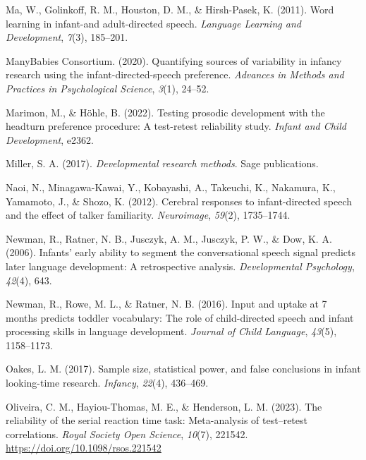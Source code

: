 \documentclass[
  man,floatsintext]{apa6}
\newlength{\cslhangindent}
\newlength{\cslentryspacingunit} %
\newenvironment{CSLReferences}[2] %
 {%
  \setlength{\parindent}{0pt}
  \ifodd #1
  \let\oldpar\par
  \def\par{\hangindent=\cslhangindent\oldpar}
  \fi
  \setlength{\parskip}{#2\cslentryspacingunit}
 }%
 {}
\begin{document}
\begin{CSLReferences}{1}{0}
\leavevmode{}%
Ma, W., Golinkoff, R. M., Houston, D. M., \& Hirsh-Pasek, K. (2011). Word learning in infant-and adult-directed speech. \emph{Language Learning and Development}, \emph{7}(3), 185--201.

\leavevmode{}%
ManyBabies Consortium. (2020). Quantifying sources of variability in infancy research using the infant-directed-speech preference. \emph{Advances in Methods and Practices in Psychological Science}, \emph{3}(1), 24--52.

\leavevmode{}%
Marimon, M., \& Höhle, B. (2022). Testing prosodic development with the headturn preference procedure: A test-retest reliability study. \emph{Infant and Child Development}, e2362.

\leavevmode{}%
Miller, S. A. (2017). \emph{Developmental research methods}. Sage publications.

\leavevmode{}%
Naoi, N., Minagawa-Kawai, Y., Kobayashi, A., Takeuchi, K., Nakamura, K., Yamamoto, J., \& Shozo, K. (2012). Cerebral responses to infant-directed speech and the effect of talker familiarity. \emph{Neuroimage}, \emph{59}(2), 1735--1744.

\leavevmode{}%
Newman, R., Ratner, N. B., Jusczyk, A. M., Jusczyk, P. W., \& Dow, K. A. (2006). Infants' early ability to segment the conversational speech signal predicts later language development: A retrospective analysis. \emph{Developmental Psychology}, \emph{42}(4), 643.

\leavevmode{}%
Newman, R., Rowe, M. L., \& Ratner, N. B. (2016). Input and uptake at 7 months predicts toddler vocabulary: The role of child-directed speech and infant processing skills in language development. \emph{Journal of Child Language}, \emph{43}(5), 1158--1173.

\leavevmode{}%
Oakes, L. M. (2017). Sample size, statistical power, and false conclusions in infant looking-time research. \emph{Infancy}, \emph{22}(4), 436--469.

\leavevmode{}%
Oliveira, C. M., Hayiou-Thomas, M. E., \& Henderson, L. M. (2023). The reliability of the serial reaction time task: Meta-analysis of test--retest correlations. \emph{Royal Society Open Science}, \emph{10}(7), 221542. \url{https://doi.org/10.1098/rsos.221542}


\end{CSLReferences}
\end{document}
